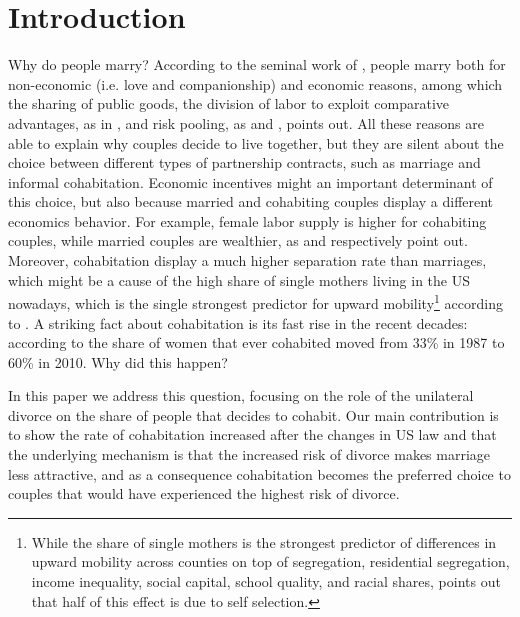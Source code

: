 \documentclass[12pt]{article}
\numberwithin{table}{section}
\begin{document}
\section{Introduction}
Why do people marry? According to the seminal work of \citet{becker1981}, people marry both for non-economic (i.e. love and companionship) and economic reasons, among which the sharing of public goods, the division of labor to exploit comparative advantages, as in \cite{chiappori1997}, and risk pooling, as \cite{voena2015} and \cite{rigas2015}, points out.
All these reasons are able to explain why couples decide to live together, but they are silent about the choice between different types of partnership contracts, such as marriage and informal cohabitation. Economic incentives might an important determinant of this choice, but also because married and cohabiting couples display a different economics behavior. For example, female labor supply is higher for cohabiting couples, while married couples are wealthier, as \cite{gemici2014} and \cite{lafortune2019} respectively point out. Moreover, cohabitation display a much higher separation rate than marriages, which might be a cause of the high share of single mothers living in the US nowadays, which is the single strongest predictor for upward mobility\footnote{While the share of single mothers is the strongest predictor of differences in upward mobility across counties on top of segregation, residential segregation, income inequality, social capital, school quality, and racial shares, \cite{chetty2018} points out that half of this effect is due to self selection.} according to \cite{chetty2018}. A striking fact about cohabitation is its fast rise in the recent decades: according to \cite{manning2013} the share of women that ever cohabited moved from 33\% in 1987 to 60\% in 2010. Why did this happen? 

In this paper we address this question, focusing on the role of the unilateral divorce on the share of people that decides to cohabit. Our main contribution is to show the rate of cohabitation increased after the changes in US law and that the underlying mechanism is that the increased risk of divorce makes marriage less attractive, and as a consequence cohabitation becomes the preferred choice to couples that would have experienced the highest risk of divorce.
\end{document}
